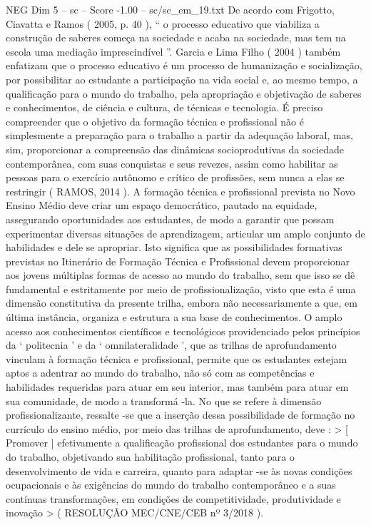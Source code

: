 \begin{textsample}{NEG Dim 5 – sc – Score -1.00 – sc/sc\_em\_19.txt}
De acordo com Frigotto, Ciavatta e Ramos ( 2005, p. 40 ), “ o processo educativo que viabiliza a construção de saberes começa na sociedade e acaba na sociedade, mas tem na escola uma mediação imprescindível ”.
Garcia e Lima Filho ( 2004 ) também enfatizam que o processo educativo é um processo de humanização e socialização, por possibilitar ao estudante a participação na vida social e, ao mesmo tempo, a qualificação para o mundo do trabalho, pela apropriação e objetivação de saberes e conhecimentos, de ciência e cultura, de técnicas e tecnologia.
É preciso compreender que o objetivo da formação técnica e profissional não é simplesmente a preparação para o trabalho a partir da adequação laboral, mas, sim, proporcionar a compreensão das dinâmicas socioprodutivas da sociedade contemporânea, com suas conquistas e seus revezes, assim como habilitar as pessoas para o exercício autônomo e crítico de profissões, sem nunca a elas se restringir ( RAMOS, 2014 ).
A formação técnica e profissional prevista no Novo Ensino Médio deve criar um espaço democrático, pautado na equidade, assegurando oportunidades aos estudantes, de modo a garantir que possam experimentar diversas situações de aprendizagem, articular um amplo conjunto de habilidades e dele se apropriar.
Isto significa que as possibilidades formativas previstas no Itinerário de Formação Técnica e Profissional devem proporcionar aos jovens múltiplas formas de acesso ao mundo do trabalho, sem que isso se dê fundamental e estritamente por meio de profissionalização, visto que esta é uma dimensão constitutiva da presente trilha, embora não necessariamente a que, em última instância, organiza e estrutura a sua base de conhecimentos.
O amplo acesso aos conhecimentos científicos e tecnológicos providenciado pelos princípios da ‘ politecnia ’ e da ‘ omnilateralidade ’, que as trilhas de aprofundamento vinculam à formação técnica e profissional, permite que os estudantes estejam aptos a adentrar ao mundo do trabalho, não só com as competências e habilidades requeridas para atuar em seu interior, mas também para atuar em sua comunidade, de modo a transformá -la.
No que se refere à dimensão profissionalizante, ressalte -se que a inserção dessa possibilidade de formação no currículo do ensino médio, por meio das trilhas de aprofundamento, deve : > [ Promover ] efetivamente a qualificação profissional dos estudantes para o mundo do trabalho, objetivando sua habilitação profissional, tanto para o desenvolvimento de vida e carreira, quanto para adaptar -se às novas condições ocupacionais e às exigências do mundo do trabalho contemporâneo e a suas contínuas transformações, em condições de competitividade, produtividade e inovação > ( RESOLUÇÃO MEC/CNE/CEB nº 3/2018 ).

\end{textsample}
